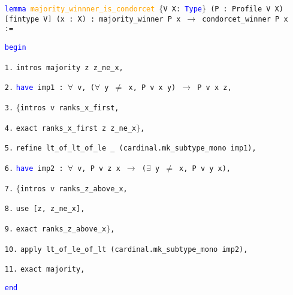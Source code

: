 \documentclass[runningheads]{llncs}
\begin{document}
\begin{itemize}
\item[] \texttt{\textcolor{blue}{lemma} \textcolor{orange}{majority\_winnner\_is\_condorcet} $\{$V X: \textcolor{blue}{Type}$\}$ (P : Profile V X) [fintype V] (x : X) : majority\_winner P x $\to$ condorcet\_winner P x :=}

\textcolor{blue}{\texttt{begin}}

\item[\texttt{1.}]\quad  \texttt{intros majority z z\_ne\_x,}
 
 

\item[\texttt{2.}]\quad  \texttt{\textcolor{blue}{have} imp1 : $\forall$ v, ($\forall$ y $\neq$ x, P v x y) $\to$ P v x z,}

\item[\texttt{3.}]\quad\quad  \texttt{$\{$intros v ranks\_x\_first,}

\item[\texttt{4.}]\quad\quad     \texttt{exact ranks\_x\_first z z\_ne\_x$\}$, }
  
\item[\texttt{5.}]\quad  \texttt{refine lt\_of\_lt\_of\_le \_ (cardinal.mk\_subtype\_mono imp1),}
 
\item[\texttt{6.}]\quad  \texttt{\textcolor{blue}{have} imp2 : $\forall$ v, P v z x $\to$ ($\exists$ y $\neq$ x, P v y x),}
 
 \item[\texttt{7.}]\quad \quad    \texttt{$\{$intros v ranks\_z\_above\_x, }
  
 \item[\texttt{8.}]\quad \quad    \texttt{use [z, z\_ne\_x], }
  
 \item[\texttt{9.}]\quad \quad    \texttt{exact ranks\_z\_above\_x$\}$,}
  
 \item[\texttt{10.}]\quad  \texttt{apply lt\_of\_le\_of\_lt (cardinal.mk\_subtype\_mono imp2),}
  
\item[\texttt{11.}]\quad  \texttt{exact majority, }
  
\textcolor{blue}{\texttt{end}}
\end{itemize}
\end{document}
